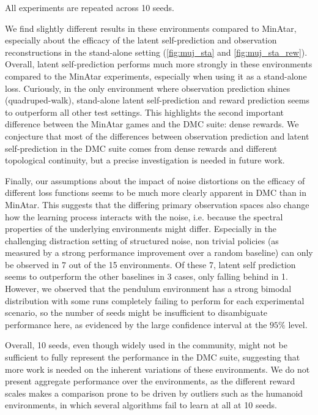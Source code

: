 All experiments are repeated across 10 seeds.

We find slightly different results in these environments compared to MinAtar, especially about the efficacy of the latent self-prediction and observation reconstructions in the stand-alone setting (\autoref{fig:muj_sta} and \autoref{fig:muj_sta_rew}). Overall, latent self-prediction performs much more strongly in these environments compared to the MinAtar experiments, especially when using it as a stand-alone loss.
Curiously, in the only environment where observation prediction shines (quadruped-walk), stand-alone latent self-prediction and reward prediction seems to outperform all other test settings.
This highlights the second important difference between the MinAtar games and the DMC suite: dense rewards.
We conjecture that most of the differences between observation prediction and latent self-prediction in the DMC suite comes from dense rewards and different topological continuity, but a precise investigation is needed in future work.

Finally, our assumptions about the impact of noise distortions on the efficacy of different loss functions seems to be much more clearly apparent in DMC than in MinAtar. This suggests that the differing primary observation spaces also change how the learning process interacts with the noise, i.e. because the spectral properties of the underlying environments might differ.
Especially in the challenging distraction setting of structured noise, non trivial policies (as measured by a strong performance improvement over a random baseline) can only be observed in 7 out of the 15 environments. Of these 7, latent self prediction seems to outperform the other baselines in 3 cases, only falling behind in 1. However, we observed that the pendulum environment has a strong bimodal distribution with some runs completely failing to perform for each experimental scenario, so the number of seeds might be insufficient to disambiguate performance here, as evidenced by the large confidence interval at the $95\%$ level.

Overall, 10 seeds, even though widely used in the community, might not be sufficient to fully represent the performance in the DMC suite, suggesting that more work is needed on the inherent variations of these environments.
We do not present aggregate performance over the environments, as the different reward scales makes a comparison prone to be driven by outliers such as the humanoid environments, in which several algorithms fail to learn at all at 10 seeds.

